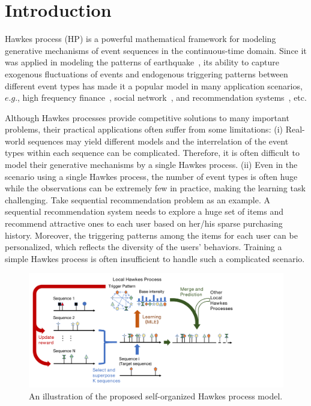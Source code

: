 \documentclass[runningheads]{llncs}
\begin{document}
\section{Introduction}
Hawkes process (HP) is a powerful mathematical framework for modeling generative mechanisms of event sequences in the continuous-time domain. 
Since it was applied in modeling the patterns of earthquake~\cite{ogata1988statistical}, its ability to capture exogenous fluctuations of events and endogenous triggering patterns between different event types has made it a popular model in many application scenarios, $e.g.$, high frequency finance~\cite{bacry2015hawkes}, social network~\cite{farajtabar2015back}, and recommendation systems~\cite{xu2018benefits}, etc.


Although Hawkes processes provide competitive solutions to many important problems, their practical applications often suffer from some limitations: 
(i) Real-world sequences may yield different models and the interrelation of the event types within each sequence can be complicated. 
Therefore, it is often difficult to model their generative mechanisms by a single Hawkes process.
(ii) Even in the scenario using a single Hawkes process, the number of event types is often huge while the observations can be extremely few in practice, making the learning task challenging. 
Take sequential recommendation problem as an example.
A sequential recommendation system needs to explore a huge set of items and recommend attractive ones to each user based on her/his sparse purchasing history. 
Moreover, the triggering patterns among the items for each user can be personalized, which reflects the diversity of the users' behaviors.
Training a simple Hawkes process is often insufficient to handle such a complicated scenario.

\begin{figure}[t]
\centerline{\includegraphics[width=0.9\linewidth]{figure1.pdf}}
\vspace{-10pt}
\caption{An illustration of the proposed self-organized Hawkes process model.}
\label{fig1}
\end{figure}
\end{document}
